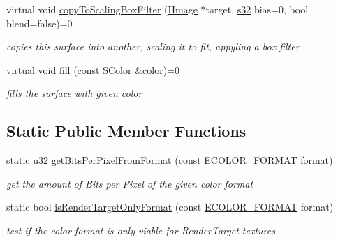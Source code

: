 \begin{DoxyCompactItemize}
\mbox{\label{classirr_1_1video_1_1IImage_a651c196f681a105fabfb5ff4f6b28682}} 
virtual void \hyperlink{classirr_1_1video_1_1IImage_a651c196f681a105fabfb5ff4f6b28682}{copy\+To\+Scaling\+Box\+Filter} (\hyperlink{classirr_1_1video_1_1IImage}{I\+Image} $\ast$target, \hyperlink{namespaceirr_ac66849b7a6ed16e30ebede579f9b47c6}{s32} bias=0, bool blend=false)=0
\begin{DoxyCompactList}\small\item\em copies this surface into another, scaling it to fit, appyling a box filter \end{DoxyCompactList}\item 
\mbox{\label{classirr_1_1video_1_1IImage_a04973e101790130f611c4c6790e5b352}} 
virtual void \hyperlink{classirr_1_1video_1_1IImage_a04973e101790130f611c4c6790e5b352}{fill} (const \hyperlink{classirr_1_1video_1_1SColor}{S\+Color} \&color)=0
\begin{DoxyCompactList}\small\item\em fills the surface with given color \end{DoxyCompactList}\end{DoxyCompactItemize}
\subsection*{Static Public Member Functions}
\begin{DoxyCompactItemize}
\item 
\mbox{\label{classirr_1_1video_1_1IImage_a70b50ef1bbb6f90ec4c43a91f521c2b6}} 
static \hyperlink{namespaceirr_a0416a53257075833e7002efd0a18e804}{u32} \hyperlink{classirr_1_1video_1_1IImage_a70b50ef1bbb6f90ec4c43a91f521c2b6}{get\+Bits\+Per\+Pixel\+From\+Format} (const \hyperlink{namespaceirr_1_1video_a1d5e487888c32b1674a8f75116d829ed}{E\+C\+O\+L\+O\+R\+\_\+\+F\+O\+R\+M\+AT} format)
\begin{DoxyCompactList}\small\item\em get the amount of Bits per Pixel of the given color format \end{DoxyCompactList}\item 
static bool \hyperlink{classirr_1_1video_1_1IImage_aafbd373ef15670708010e0064ae3b946}{is\+Render\+Target\+Only\+Format} (const \hyperlink{namespaceirr_1_1video_a1d5e487888c32b1674a8f75116d829ed}{E\+C\+O\+L\+O\+R\+\_\+\+F\+O\+R\+M\+AT} format)
\begin{DoxyCompactList}\small\item\em test if the color format is only viable for Render\+Target textures \end{DoxyCompactList}\end{DoxyCompactItemize}
